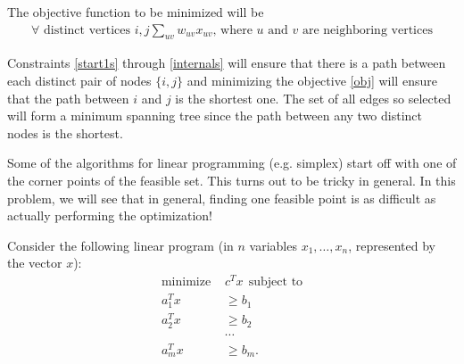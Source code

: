 \documentclass[addpoints]{exam}
\begin{document}
\begin{questions}
\begin{parts}
The objective function to be minimized will be
\begin{align}
\forall  \text{ distinct vertices } i,j \sum_{uv}w_{uv}x_{uv}  \text{, where } u \text{ and } v \text{ are neighboring vertices}\label{obj}
\end{align}

Constraints \eqref{start1s} through \eqref{internals} will ensure that there is a path between each distinct pair of nodes $\{i,j\}$ and minimizing the objective \eqref{obj} will ensure that the path between $i$ and $j$ is the shortest one. The set of all edges so selected will form a minimum spanning tree since the path between any two distinct nodes is the shortest.
\end{parts}

Some of the algorithms for linear programming (e.g. simplex) start off with one of the corner points of the feasible set.  This turns out to be tricky in general. In this problem, we will see that in general, finding one feasible point is as difficult as actually performing the optimization! 

Consider the following linear program (in $n$ variables $x_1, \dots, x_n$, represented by the vector $x$):
\begin{align*}
\text{minimize } &c^T x ~~\text{subject to} \\
a_1^T x &\ge b_1 \\
a_2^T x &\ge b_2 \\
&\cdots \\
a_m^T x &\ge b_m.
\end{align*}


\end{questions}
\end{document}
